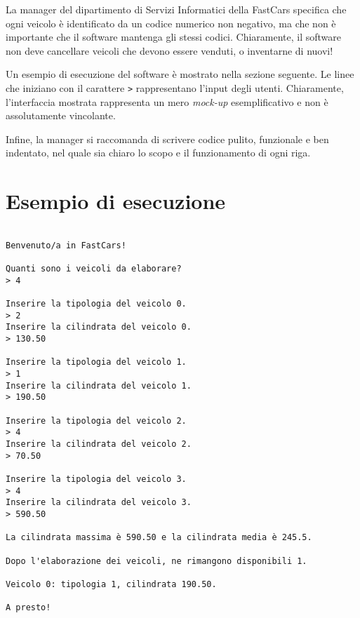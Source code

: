 \documentclass[a4paper, 11pt]{exam}
\begin{document}
La manager del dipartimento di Servizi Informatici della FastCars specifica che ogni veicolo è identificato da un codice numerico non negativo, ma che non è importante che il software mantenga gli stessi codici. 
Chiaramente, il software non deve cancellare veicoli che devono essere venduti, o inventarne di nuovi!

Un esempio di esecuzione del software è mostrato nella sezione seguente. 
Le linee che iniziano con il carattere \texttt{>} rappresentano l'input degli utenti.
Chiaramente, l'interfaccia mostrata rappresenta un mero \textit{mock-up} esemplificativo e non è assolutamente vincolante. 

Infine, la manager si raccomanda di scrivere codice pulito, funzionale e ben indentato, nel quale sia chiaro lo scopo e il funzionamento di ogni riga.

\pagebreak
\maketitle
\section*{Esempio di esecuzione}

\begin{verbatim}

Benvenuto/a in FastCars! 

Quanti sono i veicoli da elaborare?
> 4

Inserire la tipologia del veicolo 0.
> 2
Inserire la cilindrata del veicolo 0.
> 130.50

Inserire la tipologia del veicolo 1.
> 1
Inserire la cilindrata del veicolo 1.
> 190.50

Inserire la tipologia del veicolo 2.
> 4
Inserire la cilindrata del veicolo 2.
> 70.50

Inserire la tipologia del veicolo 3.
> 4
Inserire la cilindrata del veicolo 3.
> 590.50

La cilindrata massima è 590.50 e la cilindrata media è 245.5.

Dopo l'elaborazione dei veicoli, ne rimangono disponibili 1.

Veicolo 0: tipologia 1, cilindrata 190.50.

A presto!
\end{verbatim}
\end{document}
